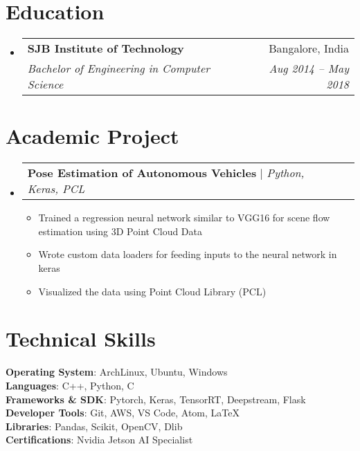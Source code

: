 \documentclass[letterpaper,11pt]{article}
\makeatletter
\newcommand{\resumeItem}[1]{
  \item\small{
    {#1 \vspace{-2pt}}
  }
}
\newcommand{\resumeSubheading}[4]{
  \vspace{-2pt}\item
    \begin{tabular*}{0.97\textwidth}[t]{l@{\extracolsep{\fill}}r}
      \textbf{#1} & #2 \\
      \textit{\small#3} & \textit{\small #4} \\
    \end{tabular*}\vspace{-7pt}
}
\newcommand{\resumeProjectHeading}[2]{
    \item
    \begin{tabular*}{0.97\textwidth}{l@{\extracolsep{\fill}}r}
      \small#1 & #2 \\
    \end{tabular*}\vspace{-7pt}
}
\newcommand{\resumeSubHeadingListStart}{\begin{itemize}[leftmargin=0.15in, label={}]}
\newcommand{\resumeSubHeadingListEnd}{\end{itemize}}
\newcommand{\resumeItemListStart}{\begin{itemize}}
\newcommand{\resumeItemListEnd}{\end{itemize}\vspace{-5pt}}
\makeatother
\begin{document}
\section{Education}
\resumeSubHeadingListStart
  \resumeSubheading
    {SJB Institute of Technology}{Bangalore, India}
    {Bachelor of Engineering in Computer Science}{Aug 2014 -- May 2018}
\resumeSubHeadingListEnd


\section{Academic Project}
    \resumeSubHeadingListStart
      \resumeProjectHeading
          {\textbf{Pose Estimation of Autonomous Vehicles} $|$ \emph{Python, Keras, PCL}}{}
          \resumeItemListStart
            \resumeItem{Trained a regression neural network similar to VGG16 for scene flow estimation using 3D Point Cloud Data}
            \resumeItem{Wrote custom data loaders for feeding inputs to the neural network in keras}
            \resumeItem{Visualized the data using Point Cloud Library (PCL)}
          \resumeItemListEnd
    \resumeSubHeadingListEnd


%
\section{Technical Skills}
 \begin{itemize}[leftmargin=0.15in, label={}]
    \small{\item{
     \textbf{Operating System}{: ArchLinux, Ubuntu, Windows} \\
     \textbf{Languages}{: C++, Python, C} \\
     \textbf{Frameworks & SDK}{: Pytorch, Keras, TensorRT, Deepstream, Flask} \\
     \textbf{Developer Tools}{: Git, AWS, VS Code, Atom, LaTeX} \\
     \textbf{Libraries}{: Pandas, Scikit, OpenCV, Dlib} \\
     \textbf{Certifications}{: Nvidia Jetson AI Specialist}
    }}
 \end{itemize}


\end{document}
